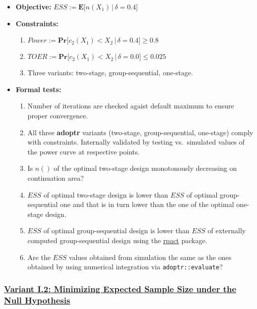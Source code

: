 \documentclass[]{book}
\providecommand{\tightlist}{%
  \setlength{\itemsep}{0pt}\setlength{\parskip}{0pt}}
\begin{document}
\begin{itemize}
\tightlist
\item
  \textbf{Objective:} \(ESS := \boldsymbol{E}\big[n(X_1)\,|\,\delta=0.4\big]\)
\item
  \textbf{Constraints:}

  \begin{enumerate}
  \def\labelenumi{\arabic{enumi}.}
  \tightlist
  \item
    \(Power := \boldsymbol{Pr}\big[c_2(X_1) < X_2\,|\,\delta=0.4\big] \geq 0.8\)
  \item
    \(TOER := \boldsymbol{Pr}\big[c_2(X_1) < X_2\,|\,\delta=0.0\big] \leq 0.025\)
  \item
    Three variants: two-stage, group-sequential, one-stage.
  \end{enumerate}
\item
  \textbf{Formal tests:}

  \begin{enumerate}
  \def\labelenumi{\arabic{enumi}.}
  \tightlist
  \item
    Number of iterations are checked agaist default maximum to ensure proper
    convergence.
  \item
    All three \textbf{adoptr} variants (two-stage, group-sequential, one-stage)
    comply with constraints. Internally validated by testing vs.~simulated
    values of the power curve at respective points.
  \item
    Is \(n()\) of the optimal two-stage design monotonously decreasing on
    continuation area?
  \item
    \(ESS\) of optimal two-stage design is lower than \(ESS\) of optimal
    group-sequential one and that is in turn lower than the one of the
    optimal one-stage design.
  \item
    \(ESS\) of optimal group-sequential design is lower than \(ESS\) of
    externally computed group-sequential design using the \href{https://rpact.org/}{rpact} package.
  \item
    Are the \(ESS\) values obtained from simulation the same as the ones
    obtained by using numerical integration via \texttt{adoptr::evaluate}?
  \end{enumerate}
\end{itemize}

\hypertarget{variant-i.2-minimizing-expected-sample-size-under-the-null-hypothesis}{%
\subsubsection{\texorpdfstring{\protect\hyperlink{variantI_2}{Variant I.2: Minimizing Expected Sample Size under the Null Hypothesis}}{Variant I.2: Minimizing Expected Sample Size under the Null Hypothesis}}\label{variant-i.2-minimizing-expected-sample-size-under-the-null-hypothesis}}
\end{document}

